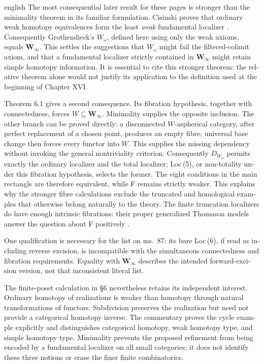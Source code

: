 \begin{otherlanguage}{english}
\begin{otherlanguage*}{english}
The most consequential later result for these pages is stronger than the minimality theorem in its familiar formulation. Cisinski proves that ordinary weak homotopy equivalences form the least \emph{weak} fundamental localizer \citep[Theorem 6.1.18, pp.~242--243]{Cisinski2006}. Consequently Grothendieck's $W_\omega$, defined here using only the weak axioms, equals $\mathbf W_\infty$. This settles the suggestions that $W_\omega$ might fail the filtered-colimit axiom, and that a fundamental localizer strictly contained in $\mathbf W_\infty$ might retain simple homotopy information. It is essential to cite this stronger theorem: the relative theorem alone would not justify its application to the definition used at the beginning of Chapter XVI.

Theorem 6.1 gives a second consequence. Its fibration hypothesis, together with connectedness, forces $W\subseteq\mathbf W_\infty$. Minimality supplies the opposite inclusion. The other branch can be proved directly: a disconnected $W$-aspherical category, after perfect replacement of a chosen point, produces an empty fibre; universal base change then forces every functor into $W$. This supplies the missing dependency without invoking the general nontriviality criterion. Consequently $D_{W_\omega}$ permits exactly the ordinary localizer and the total localizer; Loc\,(5), or non-totality under this fibration hypothesis, selects the former. The eight conditions in the main rectangle are therefore equivalent, while F remains strictly weaker. This explains why the stronger fibre calculations exclude the truncated and homological examples that otherwise belong naturally to the theory. The finite truncation localizers do have enough intrinsic fibrations: their proper generalized Thomason models answer the question about F positively \citep[\S9.2.1, Corollary 9.2.15 and Theorem 5.2.15]{Cisinski2006}.

One qualification is necessary for the list on ms.~87: its bare Loc\,(6), if read as including reverse excision, is incompatible with the simultaneous connectedness and fibration requirements. Equality with $\mathbf W_\infty$ describes the intended forward-excision version, not that inconsistent literal list.

The finite-poset calculation in \S6 nevertheless retains its independent interest. Ordinary homotopy of realizations is weaker than homotopy through natural transformations of functors. Subdivision preserves the realization but need not provide a categorical homotopy inverse. The commentary proves the cycle example explicitly and distinguishes categorical homotopy, weak homotopy type, and simple homotopy type. Minimality prevents the proposed refinement from being encoded by a fundamental localizer on all small categories; it does not identify these three notions or erase the finer finite combinatorics.


\end{otherlanguage*}
\end{otherlanguage}
